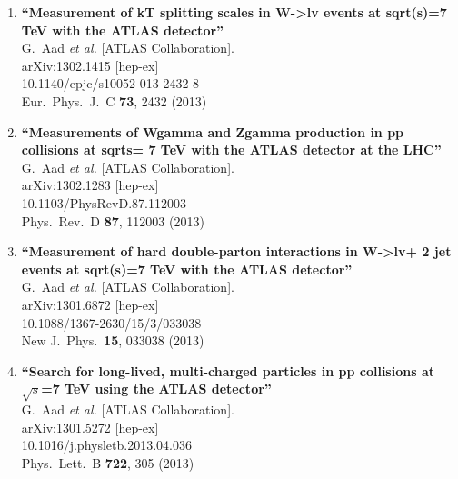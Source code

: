 \documentclass{article}
\begin{document}
\begin{enumerate}
\item%
{\bf ``Measurement of kT splitting scales in W->lv events at sqrt(s)=7 TeV with the ATLAS detector''}
  \\{}G.~Aad {\it et al.}  [ATLAS Collaboration].
  \\{}arXiv:1302.1415 [hep-ex]
    \\{}10.1140/epjc/s10052-013-2432-8
\\{}Eur.\ Phys.\ J.\ C {\bf 73}, 2432 (2013) %


\item%
{\bf ``Measurements of Wgamma and Zgamma production in pp collisions at sqrt{s}= 7 TeV with the ATLAS detector at the LHC''}
  \\{}G.~Aad {\it et al.}  [ATLAS Collaboration].
  \\{}arXiv:1302.1283 [hep-ex]
    \\{}10.1103/PhysRevD.87.112003
\\{}Phys.\ Rev.\ D {\bf 87}, 112003 (2013) %


\item%
{\bf ``Measurement of hard double-parton interactions in W->lv+ 2 jet events at sqrt(s)=7 TeV with the ATLAS detector''}
  \\{}G.~Aad {\it et al.}  [ATLAS Collaboration].
  \\{}arXiv:1301.6872 [hep-ex]
    \\{}10.1088/1367-2630/15/3/033038
\\{}New J.\ Phys.\  {\bf 15}, 033038 (2013) %


\item%
{\bf ``Search for long-lived, multi-charged particles in pp collisions at $\sqrt{s}$=7 TeV using the ATLAS detector''}
  \\{}G.~Aad {\it et al.}  [ATLAS Collaboration].
  \\{}arXiv:1301.5272 [hep-ex]
    \\{}10.1016/j.physletb.2013.04.036
\\{}Phys.\ Lett.\ B {\bf 722}, 305 (2013) %



\end{enumerate}
\end{document}
